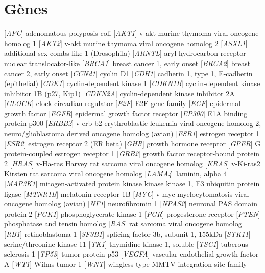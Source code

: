	\section{\textcolor{white!15!black}{Gènes}}\label{app:ac:gènes}
		\begin{acronym}[CDKN2A]
					[\emph{APC}]	{adenomatous polyposis coli}
					[\emph{AKT1}]	{v-akt murine thymoma viral oncogene homolog 1}
					[\emph{AKT2}]	{v-akt murine thymoma viral oncogene homolog 2}
					[\emph{ASXL1}]	{additional sex combs like 1 (Drosophila)}
					[\emph{ARNTL}]	{aryl hydrocarbon receptor nuclear translocator-like}
					[\emph{BRCA1}]	{breast cancer 1, early onset}
					[\emph{BRCA2}]	{breast cancer 2, early onset}
					[\emph{CCNd1}]	{cyclin D1}
					[\emph{CDH1}]	{cadherin 1, type 1, E-cadherin (epithelial)}
					[\emph{CDK1}]	{cyclin-dependent kinase 1}
				[\emph{CDKN1B}]	{cyclin-dependent kinase inhibitor 1B (p27, Kip1)}
				[\emph{CDKN2A}]	{cyclin-dependent kinase inhibitor 2A}
					[\emph{CLOCK}]	{clock circadian regulator}
					[\emph{E2F}]	{E2F gene family}
					[\emph{EGF}]	{epidermal growth factor}
					[\emph{EGFR}]	{epidermal growth factor receptor}
					[\emph{EP300}]	{E1A binding protein p300}
					[\emph{ERBB2}]	{v-erb-b2 erythroblastic leukemia viral oncogene homolog 2, neuro/glioblastoma derived oncogene homolog (avian)}
					[\emph{ESR1}]	{estrogen receptor 1}
					[\emph{ESR2}]	{estrogen receptor 2 (ER beta)}
					[\emph{GHR}]	{growth hormone receptor}
					[\emph{GPER}]	{G protein-coupled estrogen receptor 1}
					[\emph{GRB2}]	{growth factor receptor-bound protein 2}
					[\emph{HRAS}]	{v-Ha-ras Harvey rat sarcoma viral oncogene homolog}
					[\emph{KRAS}]	{v-Ki-ras2 Kirsten rat sarcoma viral oncogene homolog}
					[\emph{LAMA4}]	{laminin, alpha 4}
				[\emph{MAP3K1}]	{mitogen-activated protein kinase kinase kinase 1, E3 ubiquitin protein ligase}
				[\emph{MTNR1B}]	{melatonin receptor 1B}
					[\emph{MYC}]	{v-myc myelocytomatosis viral oncogene homolog (avian)}
					[\emph{NF1}]	{neurofibromin 1}
					[\emph{NPAS2}]	{neuronal PAS domain protein 2}
					[\emph{PGK1}]	{phosphoglycerate kinase 1}
					[\emph{PGR}]	{progesterone receptor}
					[\emph{PTEN}]	{phosphatase and tensin homolog}
					[\emph{RAS}]	{rat sarcoma viral oncogene homolog}
					[\emph{RB1}]	{retinoblastoma 1}
					[\emph{SF3B1}]	{splicing factor 3b, subunit 1, 155kDa}
					[\emph{STK11}]	{serine/threonine kinase 11}
					[\emph{TK1}]	{thymidine kinase 1, soluble}
					[\emph{TSC1}]	{tuberous sclerosis 1}
					[\emph{TP53}]	{tumor protein p53}
					[\emph{VEGFA}]	{vascular endothelial growth factor A}
					[\emph{WT1}]	{Wilms tumor 1}
					[\emph{WNT}]	{wingless-type MMTV integration site family}
		\end{acronym}


